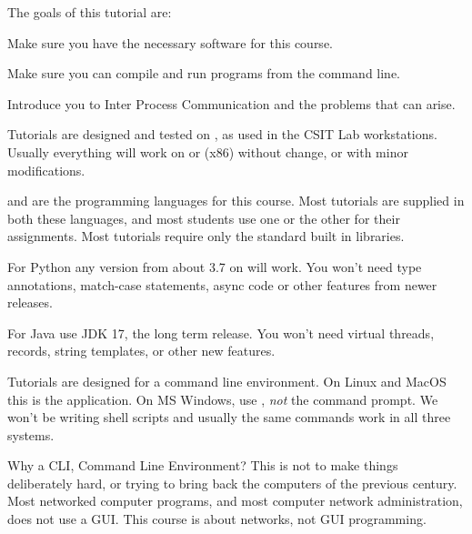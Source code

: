 










The goals of this tutorial are:

\DOT Make sure you have the necessary software for this course.

\DOT Make sure you can compile and run programs from the command line.

\DOT Introduce you to Inter Process Communication and the problems that can arise.



Tutorials are designed and tested on , as used in the CSIT Lab workstations.
Usually everything will work on  or  (x86) without change,
or with minor modifications.

 and  are the  programming languages for this course.
Most tutorials are supplied in both these languages, and most students use one or the
other for their assignments. Most tutorials require only the standard built in libraries.

For Python any version from about 3.7 on will work. You won't need type annotations,
match-case statements, async code or other features from newer releases.

For Java use JDK 17, the long term release. You won't need virtual threads,
records, string templates, or other new features.

Tutorials are designed for a command line environment. On Linux and MacOS this is the
 application. On MS Windows, use , \emph{not} the command
prompt. We won't be writing shell scripts and usually the same commands work in all
three systems.

Why a CLI, Command Line Environment? This is not to make things deliberately hard,
or trying to bring back the computers of the previous century. Most networked computer
programs, and most computer network administration, does not use a GUI. This course is
about networks, not GUI programming.

